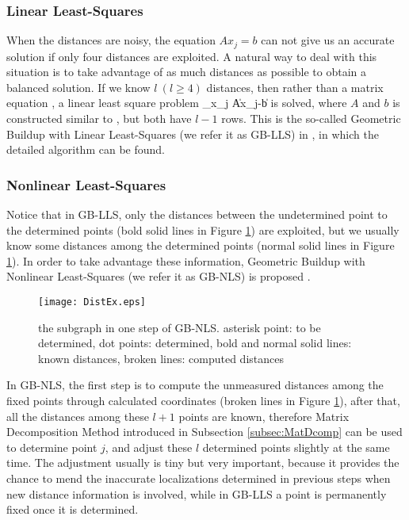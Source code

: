 \documentclass[a4paper,12pt]{article}
\begin{document}
\subsubsection{Linear Least-Squares}\label{LLS}
When the distances are noisy, the equation $Ax_j=b$ can not give us an accurate solution if only four distances are exploited. A natural way to deal with this situation is to take advantage of as much distances as possible to obtain a balanced solution. If we know $l ~(l\geq 4)$ distances, then rather than a matrix equation , a linear least square problem
\be \min_{x_j} \|Ax_j-b\| \ee
is solved, where $A$ and $b$ is constructed similar to , but both have $l-1$ rows. This is the so-called Geometric Buildup with Linear Least-Squares (we refer it as GB-LLS) in \cite{Wu2008}, in which the detailed algorithm can be found.

\subsubsection{Nonlinear Least-Squares}\label{NLS}
Notice that in GB-LLS, only the distances between the undetermined point to the determined points (bold solid lines in Figure \ref{fig:DistEx}) are exploited, but we usually know some distances among the determined points (normal solid lines in Figure \ref{fig:DistEx}). In order to take advantage these information, Geometric Buildup with Nonlinear Least-Squares (we refer it as GB-NLS) is proposed \cite{Wu2008}.

\begin{figure}[htb!]
  \centering
  \texttt{[image: DistEx.eps]}\\
  \caption{the subgraph in one step of GB-NLS. asterisk point: to be determined, dot points: determined, bold and normal solid lines: known distances, broken lines: computed distances}\label{fig:DistEx}
\end{figure}

In GB-NLS, the first step is to compute the unmeasured distances among the fixed points through calculated coordinates (broken lines in Figure \ref{fig:DistEx}), after that, all the distances among these $l+1$ points are known, therefore Matrix Decomposition Method introduced in Subsection \ref{subsec:MatDcomp} can be used to determine point $j$, and adjust these $l$ determined points slightly at the same time. The adjustment usually is tiny but very important, because it provides the chance to mend the inaccurate localizations determined in previous steps when new distance information is involved, while in GB-LLS a point is permanently fixed once it is determined.
\end{document}
